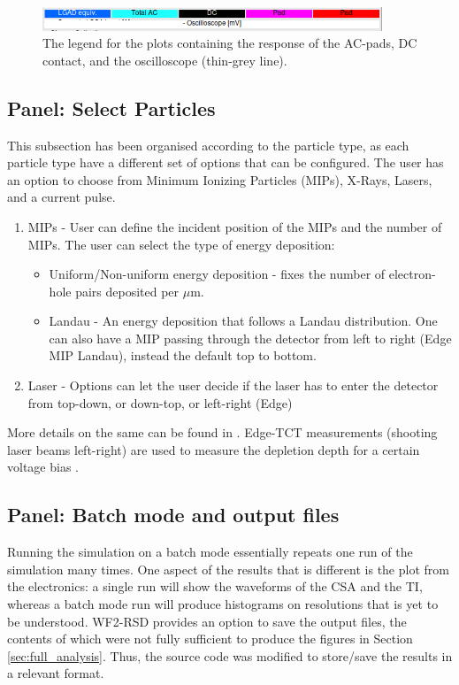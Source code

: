 \documentclass[11pt]{article}
\begin{document}
\begin{figure}[h]
    \centering
    \includegraphics[width=4in]{Images/Legend.png}
    \caption{The legend for the plots containing the response of the AC-pads, DC contact, and the oscilloscope (thin-grey line).}
    \label{fig:wf2-legend}
\end{figure}

\subsection{Panel: Select Particles}\label{sec:select-particles}
This subsection has been organised according to the particle type, as each particle type have a different set of options that can be configured. The user has an option to choose from Minimum Ionizing Particles (MIPs), X-Rays, Lasers, and a current pulse.
\begin{enumerate}
    \item MIPs - User can define the incident position of the MIPs and the number of MIPs. The user can select the type of energy deposition:
    \begin{itemize}
        \item Uniform/Non-uniform energy deposition - fixes the number of electron-hole pairs deposited per $\mu$m.
        \item Landau - An energy deposition that follows a Landau distribution. One can also have a MIP passing through the detector from left to right (Edge MIP Landau), instead the default top to bottom.
    \end{itemize}
    \item Laser - Options can let the user decide if the laser has to enter the detector from top-down, or down-top, or left-right (Edge)
\end{enumerate}
More details on the same can be found in \cite{WF2-incident-particles-cenna}.
\newline
Edge-TCT measurements (shooting laser beams left-right) are used to measure the depletion depth for a certain voltage bias \cite{moll-acceptor-removal}.

\subsection{Panel: Batch mode and output files}
Running the simulation on a batch mode essentially repeats one run of the simulation many times. One aspect of the results that is different is the plot from the electronics: a single run will show the waveforms of the CSA and the TI, whereas a batch mode run will produce histograms on resolutions that is yet to be understood.
\newline
WF2-RSD provides an option to save the output files, the contents of which were not fully sufficient to produce the figures in Section \ref{sec:full_analysis}. Thus, the source code was modified to store/save the results in a relevant format.
\end{document}

